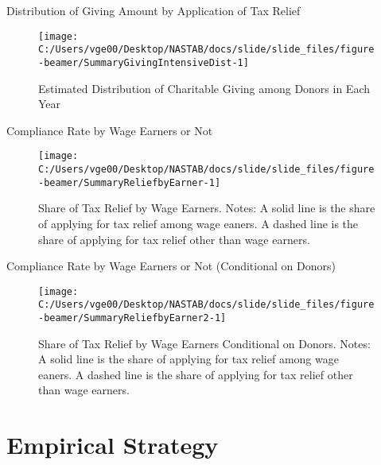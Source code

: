 \documentclass[
  ignorenonframetext,
  aspectratio=169,
]{beamer}
\begin{document}
\begin{frame}{Distribution of Giving Amount by Application of Tax Relief}
\protect\hypertarget{distribution-of-giving-amount-by-application-of-tax-relief}{}
\begin{figure}[t]

{\centering \texttt{[image: C:/Users/vge00/Desktop/NASTAB/docs/slide/slide\_files/figure-beamer/SummaryGivingIntensiveDist-1]} 

}

\caption{Estimated Distribution of Charitable Giving among Donors in Each Year}\label{fig:SummaryGivingIntensiveDist}
\end{figure}
\end{frame}

\begin{frame}{Compliance Rate by Wage Earners or Not}
\protect\hypertarget{compliance-rate-by-wage-earners-or-not}{}
\begin{figure}[t]

{\centering \texttt{[image: C:/Users/vge00/Desktop/NASTAB/docs/slide/slide\_files/figure-beamer/SummaryReliefbyEarner-1]} 

}

\caption{Share of Tax Relief by Wage Earners. Notes: A solid line is the share of applying for tax relief among wage eaners. A dashed line is the share of applying for tax relief other than wage earners.}\label{fig:SummaryReliefbyEarner}
\end{figure}
\end{frame}

\begin{frame}{Compliance Rate by Wage Earners or Not (Conditional on Donors)}
\protect\hypertarget{compliance-rate-by-wage-earners-or-not-conditional-on-donors}{}
\begin{figure}[t]

{\centering \texttt{[image: C:/Users/vge00/Desktop/NASTAB/docs/slide/slide\_files/figure-beamer/SummaryReliefbyEarner2-1]} 

}

\caption{Share of Tax Relief by Wage Earners Conditional on Donors. Notes: A solid line is the share of applying for tax relief among wage eaners. A dashed line is the share of applying for tax relief other than wage earners.}\label{fig:SummaryReliefbyEarner2}
\end{figure}
\end{frame}

\hypertarget{estimation}{%
\section{Empirical Strategy}\label{estimation}}
\end{document}
